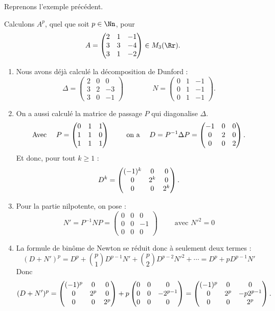 \documentclass[12pt, class=report,crop=false]{standalone}
\begin{document}
Reprenons l'exemple précédent.

\begin{exemple}
Calculons $A^p$, quel que soit $p\in \Nn$, pour 
$$A=\begin{pmatrix}2&1&-1\cr 3&3&-4\cr 3&1&-2\end{pmatrix} \in M_3(\Rr).$$

\begin{enumerate}
  \item Nous avons déjà calculé la décomposition de Dunford :
  $$\Delta = \begin{pmatrix}2 & 0 & 0 \\3 & 2 & -3 \\3 & 0 & -1\end{pmatrix}\qquad \qquad
N = \begin{pmatrix}  0 & 1 & -1 \\0 & 1 & -1 \\0 & 1 & -1\end{pmatrix}.$$
  \item On a aussi calculé la matrice de passage $P$ qui diagonalise $\Delta$.
 $$\text{Avec }\quad P=\begin{pmatrix}0&1&1\cr 1&1&0\cr1&1&1\end{pmatrix} \qquad \text{ on a } \quad
   D = P^{-1}\Delta P = \begin{pmatrix}-1&0&0\cr 0&2&0\cr 0&0&2\end{pmatrix}.$$
   Et donc, pour tout $k\ge1$ :
   $$D^k = \begin{pmatrix}(-1)^k&0&0\cr 0&2^k&0\cr 0&0&2^k\end{pmatrix}.$$
  
  \item Pour la partie nilpotente, on pose :
   $$N' = P^{-1}NP = \begin{pmatrix}
   0 & 0 & 0 \\0 & 0 & -1 \\0 & 0 & 0\end{pmatrix} \qquad \text{ avec } N'^2 = 0$$

\item La formule de binôme de Newton se réduit donc à seulement deux termes :
$$(D+N')^p = D^p + \binom{p}{1} D^{p-1}N' + \binom{p}{2} D^{p-2}N'^2 + \cdots
= D^p + pD^{p-1}N'$$
Donc 
$$(D+N')^p =
 \begin{pmatrix}(-1)^p&0&0\cr 0&2^p&0\cr 0&0&2^p\end{pmatrix}
+p\begin{pmatrix}0&0&0\cr 0&0&-2^{p-1}\cr 0&0&0\end{pmatrix}
= \begin{pmatrix}(-1)^p&0&0\cr 0&2^p&-p2^{p-1}\cr 0&0&2^p\end{pmatrix}.$$


\end{enumerate}
\end{exemple}
\end{document}
